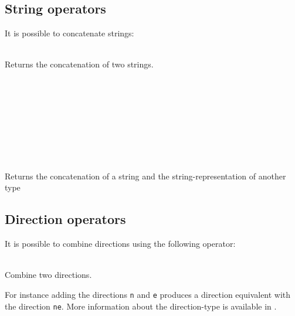 \subsection{String operators}

It is possible to concatenate strings:
\begin{dlist}
  \item {} \\
    Returns the concatenation of two strings.
  \item {} \\
    \\
    \\
    \\
    \\
    \\
    \\
    \\
    Returns the concatenation of a string and the string-representation of another type
\end{dlist}

\subsection{Direction operators}

It is possible to combine directions using the following operator:
\begin{dlist}
  \item {} \\
    Combine two directions.
\end{dlist}
For instance adding the directions \texttt{n} and \texttt{e} produces a direction
equivalent with the direction \texttt{ne}. More information about the direction-type
is available in .


